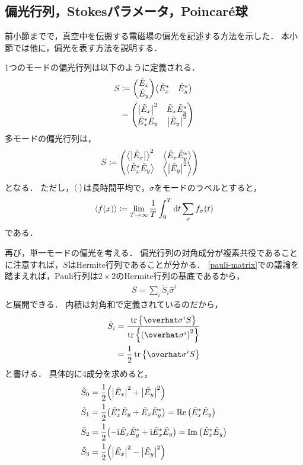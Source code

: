 \documentclass{report}
\begin{document}
  \subsection{偏光行列，Stokesパラメータ，Poincar\'e球}
    前小節までで，真空中を伝搬する電磁場の偏光を記述する方法を示した．
    本小節では他に，偏光を表す方法を説明する．
    \par
    1つのモードの偏光行列は以下のように定義される．
    \begin{align}
      S &\coloneqq \mqty(\tilde{E}_x \\ \tilde{E}_y)\mqty(\tilde{E}^*_x & \tilde{E}^*_y) \\ 
      &= \mqty(\abs{\tilde{E}_x}^2 & \tilde{E}_x\tilde{E}^*_y \\ \tilde{E}^*_x\tilde{E}_y & \abs{\tilde{E}_y}^2)
    \end{align}
    多モードの偏光行列は，
    \begin{align}
      S &\coloneqq \mqty(\ev{\abs{\tilde{E}_x}}^2 & \ev{\tilde{E}_x\tilde{E}^*_y} \\ \ev{\tilde{E}^*_x\tilde{E}_y} & \ev{\abs{\tilde{E}_y}^2})
    \end{align}
    となる．
    ただし，$\ev{\cdot}$は長時間平均で，$\sigma$をモードのラベルとすると，
    \begin{align}
      \ev{f(x)} \coloneqq \lim_{T \to \infty} \frac{1}{T}\int_{0}^{T}\dd{t}\sum_{\sigma}f_{\sigma}(t)
    \end{align}
    である．
    \par
    再び，単一モードの偏光を考える．
    偏光行列の対角成分が複素共役であることに注意すれば，$S$はHermite行列であることが分かる．
    \ref{pauli-matrix}での議論を踏まえれば，Pauli行列は$2\times 2$のHermite行列の基底であるから，
    \begin{align}
      S = \sum_{i}\check{S}_i\hat{\sigma}^i
    \end{align}
    と展開できる．
    内積は対角和で定義されているのだから，
    \begin{align}
      \check{S}_i &= \frac{\tr\qty{\hat{\sigma}^iS}}{\tr\qty{\qty(\hat{\sigma}^i)^2}} \\ 
      &= \frac{1}{2}\tr\qty{\hat{\sigma}^iS}
    \end{align}
    と書ける．
    具体的に4成分を求めると，
    \begin{align}
      \check{S}_0 &= \frac{1}{2}\qty(\abs{\tilde{E}_x}^2 + \abs{\tilde{E}_y}^2) \\ 
      \check{S}_1 &= \frac{1}{2}\qty(\tilde{E}^*_x\tilde{E}_y + \tilde{E}_x\tilde{E}^*_y ) = \Re\qty(\tilde{E}^*_x\tilde{E}_y)\\ 
      \check{S}_2 &= \frac{1}{2}\qty(-\mathrm{i}\tilde{E}_x\tilde{E}^*_y + \mathrm{i}\tilde{E}^*_x\tilde{E}_y) = \Im\qty(\tilde{E}^*_x\tilde{E}_y)\\ 
      \check{S}_3 &= \frac{1}{2}\qty(\abs{\tilde{E}_x}^2 - \abs{\tilde{E}_y}^2) 
    \end{align}
\end{document}
